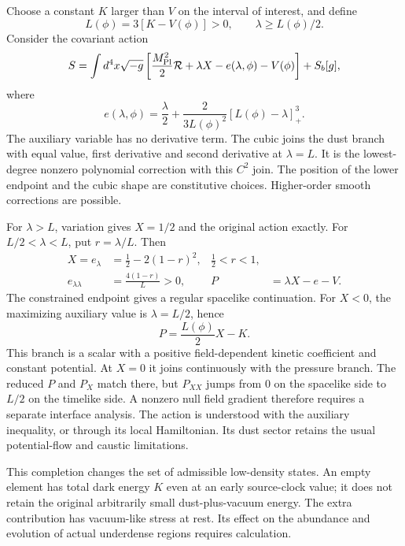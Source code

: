 \documentclass[11pt]{article}
\begin{document}
Choose a constant $K$ larger than $V$ on the interval of interest, and define
\begin{equation}
 L(\phi)=3[K-V(\phi)]>0,\qquad \lambda\ge L(\phi)/2.
\end{equation}
Consider the covariant action
\begin{equation}\label{eq:action}
 S=\int d^4x\sqrt{-g}\left[\frac{M_{\rm Pl}^2}{2}\mathcal R
       +\lambda X-e(\lambda,\phi)-V(\phi)\right]+S_b[g],
\end{equation}
where
\begin{equation}\label{eq:e}
 e(\lambda,\phi)=\frac{\lambda}{2}
       +\frac{2}{3L(\phi)^2}[L(\phi)-\lambda]_+^3.
\end{equation}
The auxiliary variable has no derivative term. The cubic joins the dust
branch with equal value, first derivative and second derivative at $\lambda=L$.
It is the lowest-degree nonzero polynomial correction with this $C^2$ join.
The position of the lower endpoint and the cubic shape are constitutive
choices. Higher-order smooth corrections are possible.

For $\lambda>L$, variation gives $X=1/2$ and the original action exactly.
For $L/2<\lambda<L$, put $r=\lambda/L$. Then
\begin{align}
 X=e_\lambda&=\tfrac12-2(1-r)^2, & \tfrac12<r<1,\label{eq:X}\\
 e_{\lambda\lambda}&=\frac{4(1-r)}{L}>0, &
 P&=\lambda X-e-V.
\end{align}
The constrained endpoint gives a regular spacelike continuation. For $X<0$,
the maximizing auxiliary value is $\lambda=L/2$, hence
\begin{equation}
 P=\frac{L(\phi)}{2}X-K.
\end{equation}
This branch is a scalar with a positive field-dependent kinetic coefficient
and constant potential. At $X=0$ it joins continuously with the pressure branch.
The reduced $P$ and $P_X$ match there, but $P_{XX}$ jumps from $0$ on the
spacelike side to $L/2$ on the timelike side. A nonzero null field gradient
therefore requires a separate interface analysis.
The action is understood with the auxiliary inequality, or through its local
Hamiltonian. Its dust sector retains the usual potential-flow and caustic
limitations.

This completion changes the set of admissible low-density states. An empty
element has total dark energy $K$ even at an early source-clock value; it
does not retain the original arbitrarily small dust-plus-vacuum energy.
The extra contribution has vacuum-like stress at rest. Its effect on the
abundance and evolution of actual underdense regions requires calculation.
\end{document}
